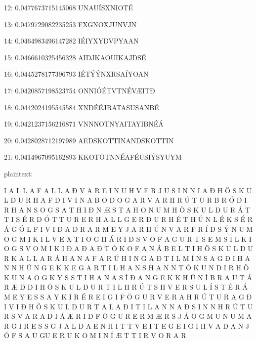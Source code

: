 \documentclass[]{article}
\begin{document}
12:	0.0477673715145068	UNAUÍSXNIOTÉ

13:	0.0479729082235253	FXGNOXJUNVJN\Thorn

14:	0.0464983496147282	IÉIYXYDVPYA\Thorn AN

15:	0.0466610325456328	AIDJKAOUIKAJDSÉ

16:	0.0445278177396793	IÉTÝÝN\Thorn XRSAÍYOAN

17:	0.0420857198523754	ONNI\Thorn ÓÉTVTNÉVÆITÐ

18:	0.0442024195545584	XND\Thorn ÉÉJRATASUSANBÉ

19:	0.0421237156216871	VN\Thorn NNOTNYAITAYIBNÉÁ

20:	0.0428028712197989	AEDSKOTTINANDSKOTTIN

21:	0.0414967095162893	KKOTÖTNNÉAFÉUSIÝSYUYM

plaintext:

\noindent I A L L A F A L L \Thorn A Ð V A R E I N U H V E R J U S I N N I A Ð H Ö S K U L D U R H A F Ð I V I N A B O Ð O G \Thorn A R V A R H R Ú T U R B R Ó Ð I R H A N S O G S A T H I Ð N Æ S T A H O N U M H Ö S K U L D U R Á T T I S É R D Ó T T U R E R H A L L G E R Ð U R H É T H Ú N L É K S É R Á G Ó L F I V I Ð A Ð R A R M E Y J A R H Ú N V A R F R Í Ð S Ý N U M O G M I K I L V E X T I O G H Á R I Ð S V O F A G U R T S E M S I L K I O G S V O M I K I Ð A Ð \Thorn A Ð T Ó K O F A N Á B E L T I H Ö S K U L D U R K A L L A R Á H A N A F A R \Thorn Ú H I N G A Ð T I L M Í N S A G Ð I H A N N H Ú N G E K K \Thorn E G A R T I L H A N S H A N N T Ó K U N D I R H Ö K U N A O G K Y S S T I H A N A S Í Ð A N G E K K H Ú N Í B R A U T \Thorn Á R Æ D D I H Ö S K U L D U R T I L H R Ú T S H V E R S U L Í S T \Thorn É R Á M E Y \Thorn E S S A \Thorn Y K I R \Thorn É R E I G I F Ö G U R V E R A H R Ú T U R \Thorn A G Ð I V I Ð H Ö S K U L D U R T A L A Ð I T I L A N N A Ð S I N N H R Ú T U R S V A R A Ð I \Thorn Á Æ R I Ð F Ö G U R E R M Æ R S J Á O G M U N U M A R G I R \Thorn E S S G J A L D A E N H I T T V E I T E G E I G I H V A Ð A N \Thorn J Ó F S A U GU E R U K O M I N Í Æ T T I R V O R A R





\end{document}
